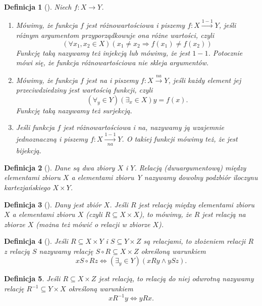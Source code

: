 \documentclass[12pt,a4paper]{report}
\newtheorem{definition}{Definicja}
\begin{document}
\begin{definition}[\citep{kraszewski2007wstkep}]
Niech $f:X\rightarrow Y$.
\begin{enumerate}
\item
Mówimy, że funkcja $f$ jest różnowartościowa i piszemy $f:X\xrightarrow{1-1} Y$, jeśli różnym argumentom przyporządkowuje ona różne wartości, czyli
\begin{equation*}
(\forall{x_{1},x_{2}}\in X)(x_{1}\ne x_{2} \Rightarrow f(x_{1})\ne f(x_{2}))
\end{equation*}
Funkcję taką nazywamy też injekcją lub mówimy, że jest $1-1$. Potocznie mówi się, że funkcja różnowartościowa nie skleja argumentów.
\item
Mówimy, że funkcja $f$ jest na i piszemy $f:X\xrightarrow{na}Y$, jeśli każdy element jej przeciwdziedziny jest wartością funkcji, czyli
\begin{equation*}
(\forall_{y}\in Y)(\exists_{x}\in X) y=f(x).
\end{equation*}
Funkcję taką nazywamy też surjekcją.
\item
Jeśli funkcja $f$ jest różnowartościowa i na, nazywamy ją wzajemnie jednoznaczną i piszemy $f:X\xrightarrow[na]{1-1} Y$. O takiej funkcji mówimy też, że jest bijekcją.
\end{enumerate}
\end{definition}
\begin{definition}[\citep{kraszewski2007wstkep}]
Dane są dwa zbiory $X$ i $Y$. Relacją (dwuargumentową) między elementami zbioru $X$ a elementami zbioru Y nazywamy dowolny podzbiór iloczynu kartezjańskiego $X \times Y$.
\end{definition}
\begin{definition}[\citep{kraszewski2007wstkep}]
Dany jest zbiór $X$. Jeśli $R$ jest relacją między elementami zbioru $X$ a elementami zbioru $X$ (czyli $R\subseteq X \times X$), to mówimy, że $R$ jest relacją na zbiorze $X$ (można też mówić o relacji w zbiorze $X$).

\end{definition}
\begin{definition}[\citep{kraszewski2007wstkep}]
Jeśli $R\subseteq X\times Y$ i $S\subseteq Y \times Z$ są relacjami, to złożeniem relacji $R$ z relacją $S$ nazywamy relację $S\circ R \subseteq X \times Z$ określoną warunkiem
\begin{equation*}
xS\circ Rz \Leftrightarrow(\exists_{y} \in Y)(xRy \wedge ySz).
\end{equation*}
\end{definition}
\begin{definition}
Jeśli $R \subseteq X \times Z$ jest relacją, to relacją do niej odwrotną nazywamy relację $R^{-1} \subseteq Y \times X$ określoną warunkiem 
\begin{equation*}
xR^{-1}y\Leftrightarrow yRx.
\end{equation*}
\end{definition}
\end{document}
